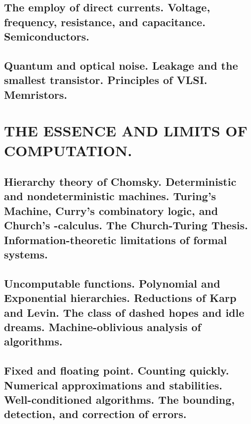\documentclass[letterpaper,draft]{memoir}
\begin{document}
\chapter{The employ of direct currents. Voltage, frequency, resistance, and capacitance. Semiconductors.}

\chapter{Quantum and optical noise. Leakage and the smallest transistor. Principles
of VLSI\@. Memristors.}


\part{THE ESSENCE AND LIMITS OF COMPUTATION\@.}


\chapter{Hierarchy theory of Chomsky. Deterministic and nondeterministic machines.
Turing's Machine, Curry's combinatory logic, and Church's \latintext-calculus. The
Church-Turing Thesis. Information-theoretic limitations of formal systems.}

\chapter{Uncomputable functions. Polynomial and Exponential hierarchies. Reductions
of Karp and Levin. The class of dashed hopes and idle dreams. Machine-oblivious analysis of algorithms.}

\chapter{Fixed and floating point. Counting quickly. Numerical approximations and
stabilities. Well-conditioned algorithms. The bounding, detection, and
correction of errors.}
\end{document}
